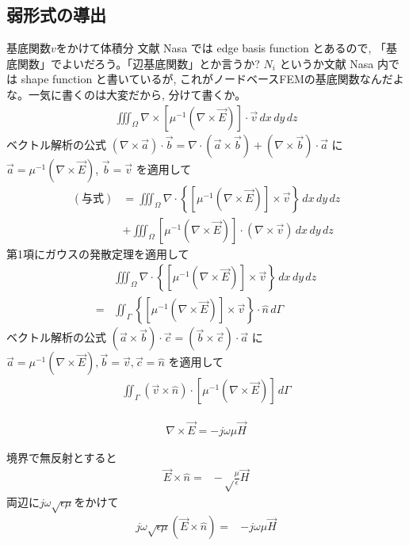 \subsection{弱形式の導出}

基底関数$v$をかけて体積分
文献 Nasa では edge basis function とあるので,
「基底関数」でよいだろう。「辺基底関数」とか言うか?
$N_i$ というか文献 Nasa 内では shape function と書いているが,
これがノードベースFEMの基底関数なんだよな。一気に書くのは大変だから,
分けて書くか。
\begin{align}
\iiint_\Omega\nabla\times\left[
\mu^{-1}\left(\nabla\times\vec{E}\right)
\right]\cdot\vec{v}\,dx\,dy\,dz
\end{align}
ベクトル解析の公式
$\left(\nabla\times\vec{a}\right)\cdot\vec{b}
=\nabla\cdot\left(\vec{a}\times\vec{b}\right)
+\left(\nabla\times\vec{b}\right)\cdot\vec{a}$
に$\vec{a}=\mu^{-1}\left(\nabla\times\vec{E}\right)$, $\vec{b}=\vec{v}$
を適用して
\begin{align}
(\textrm{与式})&=
\iiint_\Omega\nabla\cdot
\left\{\left[\mu^{-1}
\left(\nabla\times\vec{E}\right)
\right]\times\vec{v}\right\}\,dx\,dy\,dz\\
&+\iiint_\Omega\left[\mu^{-1}\left(\nabla\times\vec{E}\right)\right]\cdot
\left(\nabla\times\vec{v}\right)\,dx\,dy\,dz
\end{align}
第1項にガウスの発散定理を適用して
\begin{align}
&\iiint_{\Omega}\nabla\cdot
\left\{\left[\mu^{-1}\left(\nabla\times\vec{E}\right)\right]\times\vec{v}\right\}
\,dx\,dy\,dz\\
=&\iint_\Gamma
\left\{\left[
\mu^{-1}\left(\nabla\times\vec{E}\right)
\right]\times\vec{v}\right\}\cdot\hat{n}
\,d\Gamma
\end{align}
ベクトル解析の公式
$\left(\vec{a}\times\vec{b}\right)\cdot\vec{c}
=\left(\vec{b}\times\vec{c}\right)\cdot\vec{a}$
に
$\vec{a}=\mu^{-1}\left(\nabla\times\vec{E}\right),
 \vec{b}=\vec{v}, \vec{c}=\hat{n}$
を適用して
\begin{align}
\iint_\Gamma
\left(\vec{v}\times\hat{n}\right)\cdot
\left[\mu^{-1}\left(\nabla\times\vec{E}\right)
\right]\,d\Gamma
\end{align}

\begin{align}
\nabla\times\vec{E}=-j\omega\mu\vec{H}
\end{align}

境界で無反射とすると
\begin{align}
\vec{E}\times\hat{n}=&-\sqrt\frac{\mu}{\epsilon}\vec{H}
\end{align}
両辺に$j\omega\sqrt{\epsilon\mu}$をかけて
\begin{align}
j\omega\sqrt{\epsilon\mu}\left(\vec{E}\times\hat{n}\right)=&-j\omega\mu\vec{H}
\end{align}

